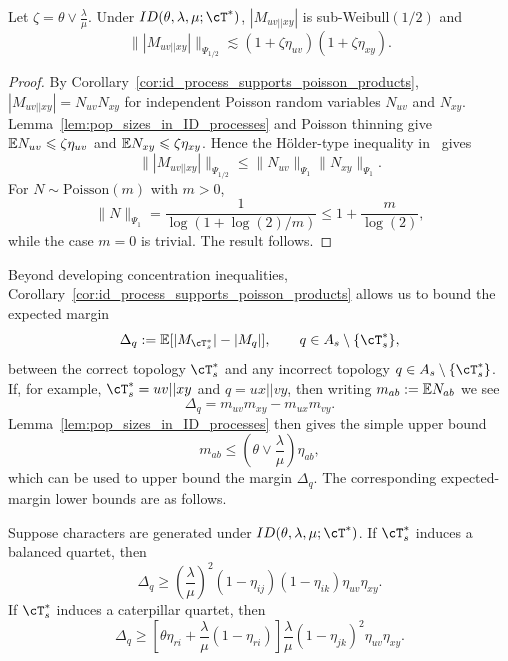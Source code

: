 \begin{lemma}
\label{lem:canby_subweibull_quartet_supports}
    Let $\zeta = \theta \vee \frac{\lambda}{\mu}$. Under $ID(\theta, \lambda, \mu; \cT^*)$,
    $|M_{uv||xy}|$ is sub-Weibull$(1/2)$ and
    \[\bigl\||M_{uv||xy}|\bigr\|_{\Psi_{1/2}} \lesssim
    \left(1 + \zeta\eta_{uv} \right) \left(1 + \zeta\eta_{xy} \right).\]
\end{lemma}

\begin{proof}
    By Corollary~\ref{cor:id_process_supports_poisson_products},
    $|M_{uv||xy}|=N_{uv}N_{xy}$ for independent Poisson random variables $N_{uv}$ and $N_{xy}$.
    Lemma~\ref{lem:pop_sizes_in_ID_processes} and Poisson thinning give
    $\mathbb{E} N_{uv}\leqslant\zeta\eta_{uv}$ and $\mathbb{E} N_{xy}\leqslant\zeta\eta_{xy}$.
    Hence the H\"older-type inequality in~\cite[equation~(3.5)]{kuchibhotla2022_beyond_sub_gaussian_high_dimensional_statistics} gives
    \[\bigl\||M_{uv||xy}|\bigr\|_{\Psi_{1/2}} \leq \|N_{uv}\|_{\Psi_1}\|N_{xy}\|_{\Psi_1}.\]
    \noindent For $N\sim\mathrm{Poisson}(m)$ with $m>0$,
    \[\|N\|_{\Psi_1}=\frac{1}{\log(1+\log(2)/m)}\leq 1+\frac{m}{\log(2)},\]
    \noindent while the case $m=0$ is trivial. The result follows.
\end{proof}

Beyond developing concentration inequalities, Corollary~\ref{cor:id_process_supports_poisson_products}
allows us to bound the expected margin
%
    \[\Delta_q := \E [ |M_{\cT_s^*}| - |M_q|],
    \qquad q \in A_s \setminus \{\cT_s^*\},\]
%
\noindent between the correct topology $\cT_s^*$ and any incorrect topology $q \in A_s \setminus \{\cT_s^*\}$.
If, for example, $\cT_s^* = uv || xy$ and $q = ux||vy$, then writing $m_{ab}:=\mathbb{E} N_{ab}$ we see
%
\[\Delta_q =m_{uv}m_{xy}-m_{ux}m_{vy}.\]
%
Lemma~\ref{lem:pop_sizes_in_ID_processes} then gives the simple upper bound
%
\[m_{ab}\leq\left(\theta\vee\frac{\lambda}{\mu}\right)\eta_{ab},\]
%
\noindent which can be used to upper bound the margin $\Delta_q$. The corresponding
expected-margin lower bounds are as follows.

\begin{corollary}
\label{cor:expected_margin_under_id}
Suppose characters are generated under $ID(\theta,\lambda,\mu;\cT^*)$. If $\cT_s^*$ induces a balanced quartet, then
\[
    \Delta_q \geq \left(\frac{\lambda}{\mu}\right)^2
    (1-\eta_{ij})(1-\eta_{ik})\eta_{uv}\eta_{xy}.
\]
If $\cT_s^*$ induces a caterpillar quartet, then
\[
    \Delta_q \geq
    \left[\theta\eta_{ri}+\frac{\lambda}{\mu}(1-\eta_{ri})\right]
    \frac{\lambda}{\mu}(1-\eta_{jk})^2\eta_{uv}\eta_{xy}.
\]
\end{corollary}

